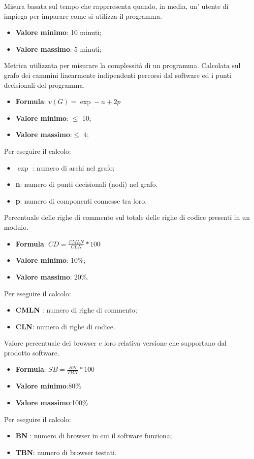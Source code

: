 Misura basata sul tempo che rapprresenta quando, in media, un' utente di impiega per imparare come si utilizza il programma.
\begin{itemize}
    \item \textbf{Valore minimo}: 10 minuti;
    \item \textbf{Valore massimo}: 5 minuti;
\end{itemize}  

Metrica utilizzata per misurare la complessità di un programma. Calcolata sul grafo dei cammini linearmente indipendenti percorsi dal software ed i punti decisionali del programma.
\begin{itemize}
    \item \textbf{Formula}: $v(G)=\exp-n+2p$
    \item \textbf{Valore minimo}: $\leq$ 10;
    \item \textbf{Valore massimo}:$\leq$ 4;
\end{itemize}  
Per eseguire il calcolo:
\begin{itemize}
    \item \textbf{$\exp$} : numero di archi nel grafo;
    \item \textbf{n}: numero di punti decisionali (nodi) nel grafo.
    \item \textbf{p}: numero di componenti connesse tra loro.
\end{itemize}

Percentuale delle righe di commento sul totale delle righe di codice presenti in un modulo.
\begin{itemize}
    \item \textbf{Formula}: $CD=\frac{CMLN}{CLN}*100$
    \item \textbf{Valore minimo}: 10\%;
    \item \textbf{Valore massimo}: 20\%.
\end{itemize}  
Per eseguire il calcolo:
\begin{itemize}
    \item \textbf{CMLN} : numero di righe di commento;
    \item \textbf{CLN}: numero di righe di codice.
\end{itemize}

Valore percentuale dei browser e loro relativa versione che supportano dal prodotto software.
\begin{itemize}
    \item \textbf{Formula}: $SB=\frac{BN}{TBN}*100$
    \item \textbf{Valore minimo}:80\%
    \item \textbf{Valore massimo}:100\%
\end{itemize}  
Per eseguire il calcolo:
\begin{itemize}
    \item \textbf{BN} : numero di browser in cui il software funziona;
    \item \textbf{TBN}: numero di browser testati.
\end{itemize}

